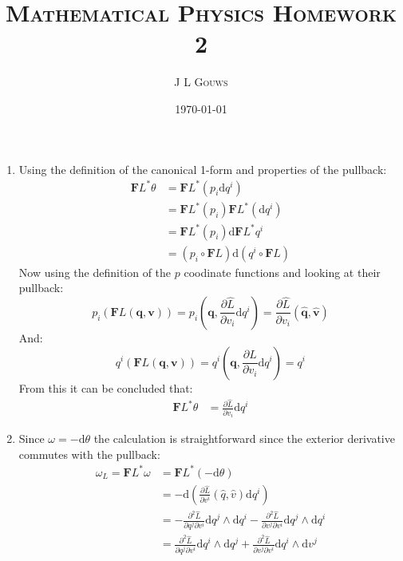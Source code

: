 \documentclass[12pt,a4]{article}
\title{
\textsc{Mathematical Physics Homework 2}
}
\author{\textsc{J L Gouws}
}
\date{\today
\\[1cm]}
\newcommand{\e}{\mathrm{d}}
\begin{document}
\thispagestyle{empty}

\maketitle

\begin{enumerate}
  \item
    Using the definition of the canonical 1-form and properties of the pullback:
    \begin{align*}
      \mathbf{F} L^* \theta 
        &= \mathbf{F} L^* (p_i \e q^i) \\
        &= \mathbf{F} L^* (p_i) \mathbf{F} L^* (\e q^i) \\
        &= \mathbf{F} L^* (p_i) \e \mathbf{F} L^* q^i \\
        &= (p_i\circ \mathbf{F} L)   \e  (q^i \circ \mathbf{F} L) 
    \end{align*}
    Now using the definition of the $p$ coodinate functions and looking at their pullback:
    \begin{equation*}
      p_i( \mathbf{F} L(\mathbf{q}, \mathbf{v})) = p_i\left(\mathbf{q}, \frac{\partial \hat L}{\partial v_i} \e q^i\right) = \frac{\partial \hat L}{\partial v_i}(\hat{\mathbf{q}}, \hat{\mathbf{v}})
    \end{equation*}
    And:
    \begin{equation*}
      q^i( \mathbf{F} L(\mathbf{q}, \mathbf{v})) = q^i\left(\mathbf{q}, \frac{\partial \hat L}{\partial v_i} \e q^i\right) = q^i
    \end{equation*}
    From this it can be concluded that:
    \begin{align*}
      \mathbf{F} L^* \theta 
        &= \frac{\partial \hat L}{\partial v_i} \e q^i 
    \end{align*}
  \item
    Since $\omega = - \e \theta$ the calculation is straightforward since the exterior derivative commutes with the pullback:
    \begin{align*}
      \omega_L = 
        \mathbf{F} L^* \omega
        &= \mathbf{F} L^*(- \e \theta) \\
        &= - \e \left(\frac{\partial \hat L}{\partial v^i}(\hat q, \hat v) \e q^i \right) \\
        &= - \frac{\partial^2 \hat L}{\partial q^j \partial v^i} \e q^j \wedge \e q^i - \frac{\partial^2 \hat L}{\partial v^j \partial v^i} \e q^j \wedge \e q^i  \\
        &= \frac{\partial^2 \hat L}{\partial q^j \partial v^i} \e q^i \wedge \e q^j + \frac{\partial^2 \hat L}{\partial v^j \partial v^i} \e q^i \wedge \e v^j 

\end{align*}
\end{enumerate}
\end{document}
